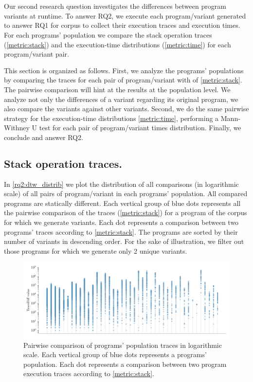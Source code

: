 \section{\rqtwo}



Our second research question investigates the differences between program variants at runtime.
To answer RQ2, we execute each program/variant generated to answer RQ1 for \corpusrosetta corpus to collect their execution traces and execution times.
For each programs' population we compare the stack operation traces (\autoref{metric:stack}) and the execution-time distributions (\autoref{metric:time}) for each program/variant pair.

This section is organized as follows. First, we analyze the programs' populations by comparing the traces for each pair of program/variant with \DTW of \autoref{metric:stack}. The pairwise comparison will hint at the results at the population level. We analyze not only the differences of a variant regarding its original program, we also compare the variants against other variants. Second, we do the same pairwise strategy for the execution-time distributions \autoref{metric:time}, performing a Mann-Withney U test for each pair of program/variant times distribution. Finally, we conclude and answer RQ2.

\subsection{Stack operation traces.}


In \autoref{rq2:dtw_distrib} we plot the distribution of all comparisons (in logarithmic scale) of all pairs of program/variant in each programs' population. All compared programs are statically different. Each vertical group of blue dots  represents all the pairwise comparison of the traces (\autoref{metric:stack}) for a program of the \corpusrosetta corpus for which we generate variants.
Each dot represents a comparison between two programs' traces according to \autoref{metric:stack}. 
The programs are sorted by their number of variants in descending order. For the sake of illustration, we filter out those programs for which we generate only 2 unique variants. 

\begin{figure}[h]
    \centering
    \includegraphics[width=\linewidth]{plots/plot_distribs1.png}
    \caption{Pairwise comparison of programs' population traces in logarithmic scale. Each vertical group of blue dots represents a programs' population. Each dot represents a comparison between two program execution traces according to \autoref{metric:stack}. }
    \label{rq2:dtw_distrib}
\end{figure}

